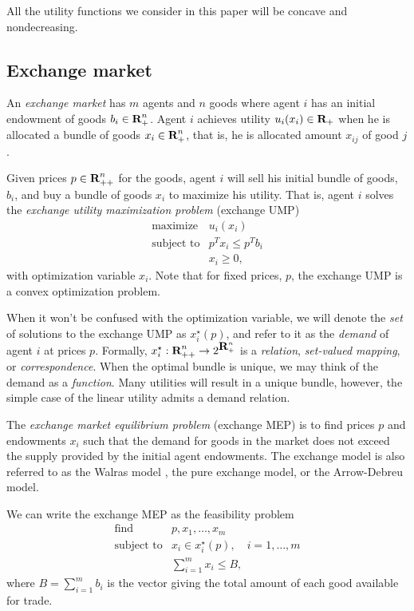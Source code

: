 \documentclass[12pt]{article}
\begin{document}
All the utility functions we consider in this paper will be concave and
nondecreasing.

\subsection{Exchange market}
\label{sec:exchange_def}

An \emph{exchange market} has $m$ agents and $n$ goods where agent $i$ has an
initial endowment of goods $b_i \in {\mbox{\bf R}}_+^n$. Agent $i$ achieves utility
$u_i(x_i) \in {\mbox{\bf R}}_+$ when he is allocated a bundle of goods $x_i \in
{\mbox{\bf R}}^n_{+}$, that is, he is allocated amount $x_{ij}$ of good $j$.

Given prices $p \in {\mbox{\bf R}}^n_{++}$ for the goods, agent $i$ will sell his
initial bundle of goods, $b_i$, and buy a bundle of goods $x_i$ to maximize his
utility. That is, agent $i$ solves the \emph{exchange utility maximization
problem} (exchange UMP)
\begin{equation}
\label{p-ump}
\begin{array}{ll}
\mbox{maximize} & u_i(x_i) \\
\mbox{subject to} & p^T x_i \leq p^T b_i \\
& x_i \geq 0,
\end{array}
\end{equation}
with optimization variable $x_i$. Note that for fixed prices, $p$, the exchange
UMP is a convex optimization problem.

When it won't be confused with the optimization variable, we will denote the
\emph{set} of solutions to the exchange UMP as $x^\star_i(p)$, and refer to it
as the \emph{demand} of agent $i$ at prices $p$.
Formally, $x_i^\star : {\mbox{\bf R}}^n_{++} \to 2^{{\mbox{\bf R}}^n_+}$ is a \emph{relation},
\emph{set-valued mapping}, or \emph{correspondence}. When the optimal bundle is
unique, we may think of the demand as a \emph{function}.
Many utilities will result in a unique bundle, however, the simple 
case of the linear utility admits a demand relation.

The \emph{exchange market equilibrium problem} (exchange MEP) is to find prices
$p$ and endowments $x_i$ such that the demand for goods in the market does not
exceed the supply provided by the initial agent endowments. The exchange model
is also referred to as the Walras model \cite{walras1896elements}, the pure
exchange model, or the Arrow-Debreu model.

We can write the exchange MEP as the feasibility problem
\begin{equation}
\label{p-mep}
\begin{array}{ll}
\mbox{find} & p, x_1, \ldots, x_m \\
\mbox{subject to} & x_i \in x_i^\star(p),\quad i = 1,\ldots, m \\
& \sum_{i=1}^m x_i \leq B,
\end{array}
\end{equation}
where $B = \sum_{i=1}^m b_i$ is the vector giving the total amount of each good
available for trade.
\end{document}
